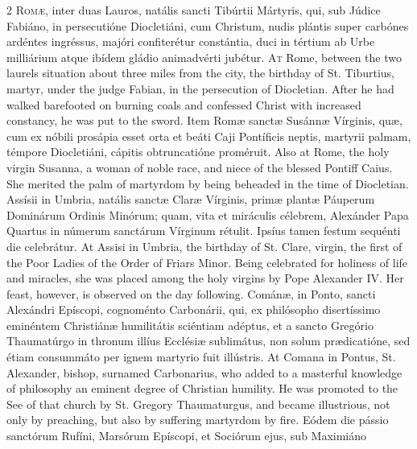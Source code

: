\begin{paracol}{2}
\lettrine[lines=2]{R}{omæ,} inter duas Lauros, 
 natális sancti Tibúrtii Mártyris, qui, sub Júdice Fabiáno, in persecutióne 
 Diocletiáni, cum Christum, nudis plántis super carbónes ardéntes ingréssus, 
 majóri confiterétur constántia, duci in tértium ab Urbe milliárium atque 
 ibídem gládio animadvérti jubétur.
\switchcolumn
{}
\lettrine[lines=2]{A}{t} Rome, between the two laurels 
 situation about three miles from the city, the birthday of St. Tiburtius, 
 martyr, under the judge Fabian, in the persecution of Diocletian. 
 After he had walked barefooted on burning coals and confessed Christ with 
 increased constancy, he was put to the sword.
\switchcolumn*
{}
Item Romæ sanctæ 
 Susánnæ Vírginis, quæ, cum ex nóbili prosápia esset orta et beáti Caji 
 Pontíficis neptis, martyrii palmam, témpore Diocletiáni, cápitis 
 obtruncatióne proméruit.
\switchcolumn
{}
Also at Rome, the holy virgin 
 Susanna, a woman of noble race, and niece of the blessed Pontiff Caius. 
 She merited the palm of martyrdom by being beheaded in the time of 
 Diocletian.
\switchcolumn*
{}
Assísii in Umbria, 
 natális sanctæ Claræ Vírginis, primæ plantæ Páuperum Dominárum Ordinis 
 Minórum; quam, vita et miráculis célebrem, Alexánder Papa Quartus in númerum 
 sanctárum Vírginum rétulit. Ipsíus tamen festum sequénti die 
 celebrátur.
\switchcolumn
{}
At Assisi in Umbria, the birthday of 
 St. Clare, virgin, the first of the Poor Ladies of the Order of Friars 
 Minor. Being celebrated for holiness of life and miracles, she was 
 placed among the holy virgins by Pope Alexander IV. Her feast, 
 however, is observed on the day following.
\switchcolumn*
{}
Cománæ, in Ponto, 
 sancti Alexándri Epíscopi, cognoménto Carbonárii, qui, ex philósopho disertíssimo eminéntem Christiánæ humilitátis sciéntiam adéptus, et a sancto 
 Gregório Thaumatúrgo in thronum illíus Ecclésiæ sublimátus, non solum 
 prædicatióne, sed étiam consummáto per ignem martyrio fuit illústris.
\switchcolumn
{}
At Comana in Pontus, St. Alexander, 
 bishop, surnamed Carbonarius, who added to a masterful knowledge of 
 philosophy an eminent degree of Christian humility. He was promoted to 
 the See of that church by St. Gregory Thaumaturgus, and became illustrious, 
 not only by preaching, but also by suffering martyrdom by fire.
\switchcolumn*
{}
Eódem die pássio 
 sanctórum Rufíni, Marsórum Epíscopi, et Sociórum ejus, sub Maximiáno 

\end{paracol}
